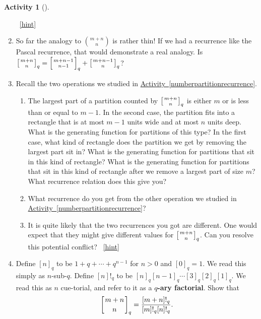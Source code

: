 \documentclass[10pt,]{book}
\newcommand{\terminology}[1]{\textbf{#1}}
\theoremstyle{plain}
\theoremstyle{definition}
\theoremstyle{definition}
\theoremstyle{definition}
\newtheorem{activity}[project]{Activity}
\numberwithin{equation}{chapter}
\newcommand{\qchoose}[2]{\left[{#1\atop#2}\right]_q}
\begin{document}
\begin{activity}[]
\begin{enumerate}[font=\bfseries,label=(\alph*),ref=\alph*]
~\hfill{\tiny\hyperlink{a-265.c}{[hint]}\hypertarget{q-265.c}{}}\item\label{task-213} \hypertarget{p-1218}{}%
So far the analogy to \(\binom{m+n}{n}\) is rather thin! If we had a recurrence like the Pascal recurrence, that would demonstrate a real analogy. Is \(\qchoose{m+n}{n}= \qchoose{m+n-1}{n-1}+\qchoose{m+n-1}{n}\)?%
\item\label{task-214} \hypertarget{p-1220}{}%
Recall the two operations we studied in \hyperref[numberpartitionrecurrence]{Activity~\ref{numberpartitionrecurrence}}.%
\begin{enumerate}[font=\bfseries,label=(\roman*),ref=\theenumi.\roman*]
\item\label{task-215} \hypertarget{p-1221}{}%
The largest part of a partition counted by \(\qchoose{m+n}{n}\) is either \(m\) or is less than or equal to \(m-1\).  In the second case, the partition fits into a rectangle that is at most \(m-1\) units wide and at most \(n\) units deep.  What is the generating function for partitions of this type?  In the first case, what kind of rectangle does the partition we get by removing the largest part sit in?  What is the generating function for partitions that sit in this kind of rectangle?  What is the generating function for partitions that sit in this kind of rectangle after we remove a largest part of size \(m\)?  What recurrence relation does this give you?%
\item\label{task-216} \hypertarget{p-1225}{}%
What recurrence do you get from the other operation we studied in \hyperref[numberpartitionrecurrence]{Activity~\ref{numberpartitionrecurrence}}?%
\item\label{task-217} \hypertarget{p-1227}{}%
It is quite likely that the two recurrences you got are different.  One would expect that they might give different values for \(\qchoose{m+n}{n}\).  Can you resolve this potential conflict?%
~\hfill{\tiny\hyperlink{a-265.e.iii}{[hint]}\hypertarget{q-265.e.iii}{}}\end{enumerate}
\item\label{task-218} \hypertarget{p-1230}{}%
Define \([n]_q\) to be \(1+q+\cdots+q^{n-1}\) for \(n>0\) and \([0]_q =1\).  We read this simply as \(n\)-sub-\(q\). Define \([n]!_q\) to be \([n]_q[n-1]_q\cdots [3]_q[2]_q[1]_q\). We read this as \(n\) cue-torial, and refer to it as a \terminology{\(q\)-ary factorial}. Show that%
\begin{equation*}
\qchoose{m+n}{n} = \frac{[m+n]!_q}{[m]!_q[n]!_q}.

\end{equation*}
\end{enumerate}
\end{activity}
\end{document}
